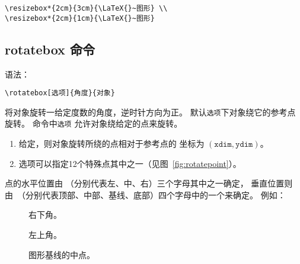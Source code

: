 \begin{center}
\begin{minipage}[b]{.4\textwidth}
	\begin{center}
		\par\vspace{0pt}
	\end{center}
\end{minipage}%
\begin{minipage}[b]{.6\textwidth}
\begin{lstlisting}
\resizebox*{2cm}{3cm}{\LaTeX{}~图形} \\
\resizebox*{2cm}{1cm}{\LaTeX{}~图形}
\end{lstlisting}
\par\vspace{0pt}
\end{minipage}
\end{center}


\subsection{rotatebox 命令}\label{ssec:rotatebox}
语法：
\begin{lstlisting}
\rotatebox[选项]{角度}{对象}
\end{lstlisting}
 将对象旋转一给定度数的角度，逆时针方向为正。
默认\texttt{选项}下对象绕它的参考点旋转。
 命令中\texttt{选项} 允许对象绕给定的点来旋转。
\begin{enumerate}
	\item 给定\opt{[x=xdim,y=ydim]}，则对象旋转所绕的点相对于参考点的
	坐标为 $(\mathtt{xdim}, \mathtt{ydim})$。
	\item {} 选项可以指定12个特殊点其中之一（见图~\ref{fig:rotatepoint}）。
\end{enumerate}

 点的水平位置由 （分别代表左、中、右）三个字母其中之一确定，
垂直位置则由~（分别代表顶部、中部、基线、底部）四个字母中的一个来确定。
例如：
\begin{description}
	\item [\opt{[rb]}] 右下角。
	\item [\opt{[lt]}] 左上角。
	\item [\opt{[cB]}] 图形基线的中点。
\end{description}

